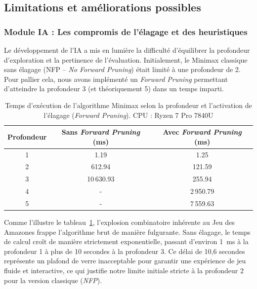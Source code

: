 \documentclass[a4paper]{article}
\begin{document}
\subsection{Limitations et améliorations possibles}

\subsubsection{Module IA : Les compromis de l'élagage et des heuristiques}

Le développement de l'IA a mis en lumière la difficulté d'équilibrer la profondeur d'exploration et la pertinence de l'évaluation. Initialement, le Minimax classique sans élagage (NFP -- \textit{No Forward Pruning}) était limité à une profondeur de 2. Pour pallier cela, nous avons implémenté un \textit{Forward Pruning} permettant d'atteindre la profondeur 3 (et théoriquement 5) dans un temps imparti.

\begin{table}[H]
    \centering
    \begin{tabular}{ccc}
        \toprule
        \textbf{Profondeur} & \textbf{Sans \textit{Forward Pruning} (ms)} & \textbf{Avec \textit{Forward Pruning} (ms)} \\
        \midrule
        1 & 1.19 & 1.25 \\
        2 & 612.94 & 121.59 \\
        3 & 10\,630.93 & 255.94 \\
        4 & - & 2\,950.79 \\
        5 & - & 7\,559.63 \\
        \bottomrule
    \end{tabular}
    \caption{Temps d'exécution de l'algorithme Minimax selon la profondeur et l'activation de l'élagage (\textit{Forward Pruning}). CPU : Ryzen 7 Pro 7840U }
    \label{tab:minimax_times}
\end{table}

Comme l'illustre le tableau~\ref{tab:minimax_times}, l'explosion combinatoire inhérente au Jeu des Amazones frappe l'algorithme brut de manière fulgurante. Sans élagage, le temps de calcul croît de manière strictement exponentielle, passant d'environ 1~ms à la profondeur 1 à plus de 10 secondes à la profondeur 3. Ce délai de 10,6 secondes représente un plafond de verre inacceptable pour garantir une expérience de jeu fluide et interactive, ce qui justifie notre limite initiale stricte à la profondeur 2 pour la version classique (\textit{NFP}).
\end{document}
